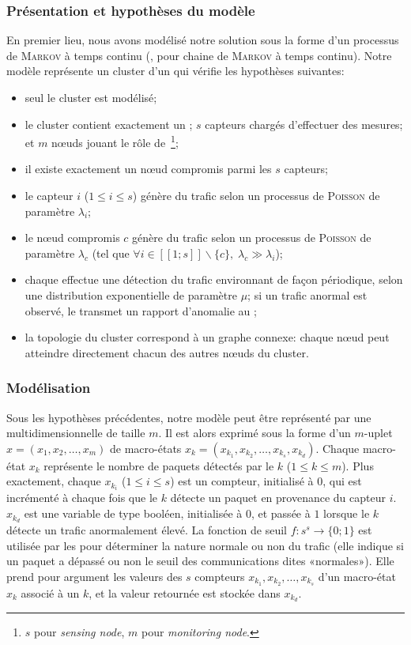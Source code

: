         \subsubsection{Présentation et hypothèses du modèle}
En premier lieu, nous avons modélisé notre solution sous la forme d'un processus de \textsc{Markov} à temps continu (\cmtc, pour chaine de \textsc{Markov} à temps continu).
Notre modèle représente un cluster d'un \rcsf qui vérifie les hypothèses suivantes:
\begin{itemize}
    \item seul le cluster est modélisé;
    \item le cluster contient exactement un \CH; $s$ capteurs chargés d'effectuer des mesures; et $m$ nœuds jouant le rôle de \cns\,\footnote{$s$ pour \textit{sensing node}, $m$ pour \textit{monitoring node}.};
    \item il existe exactement un nœud compromis parmi les $s$ capteurs;
    \item le capteur $i$ ($1 \leq i \leq s$) génère du trafic selon un processus de \textsc{Poisson} de paramètre $\lambda_i$;
    \item le nœud compromis $c$ génère du trafic selon un processus de \textsc{Poisson} de paramètre $\lambda_c$ (tel que $\forall i\in[\![1;s]\!]\backslash\{c\},\; \lambda_c\gg\lambda_i$);
    \item chaque \cn effectue une détection du trafic environnant de façon périodique, selon une distribution exponentielle de paramètre $\mu$; si un trafic anormal est observé, le \cn transmet un rapport d'anomalie au \CH;
    \item la topologie du cluster correspond à un graphe connexe: chaque nœud peut atteindre directement chacun des autres nœuds du cluster.
\end{itemize}

        \subsubsection{Modélisation}
Sous les hypothèses précédentes, notre modèle peut être représenté par une \cmtc multidimensionnelle de taille $m$.
Il est alors exprimé sous la forme d'un $m$-uplet $x\!=\!(x_1,x_2,\dots,x_m)$ de macro-états $x_k\!=\!(x_{k_1},x_{k_2},\dots,x_{k_s},x_{k_d})$.
Chaque macro-état $x_k$ représente le nombre de paquets détectés par le \cn $k$ ($1\leq k\leq m$).
Plus exactement, chaque $x_{k_i}$ ($1\leq i\leq s$) est un compteur, initialisé à $0$, qui est incrémenté à chaque fois que le \cn $k$ détecte un paquet en provenance du capteur $i$.
$x_{k_d}$ est une variable de type booléen, initialisée à $0$, et passée à $1$ lorsque le \cn $k$ détecte un trafic anormalement élevé.
La fonction de seuil $f:s^s\rightarrow\{0;1\}$ est utilisée par les \cns pour déterminer la nature normale ou non du trafic (elle indique si un paquet a dépassé ou non le seuil des communications dites «normales»).
Elle prend pour argument les valeurs des $s$ compteurs $x_{k_1},x_{k_2},\dots,x_{k_s}$ d'un macro-état $x_k$ associé à un \cn $k$, et la valeur retournée est stockée dans $x_{k_d}$.

